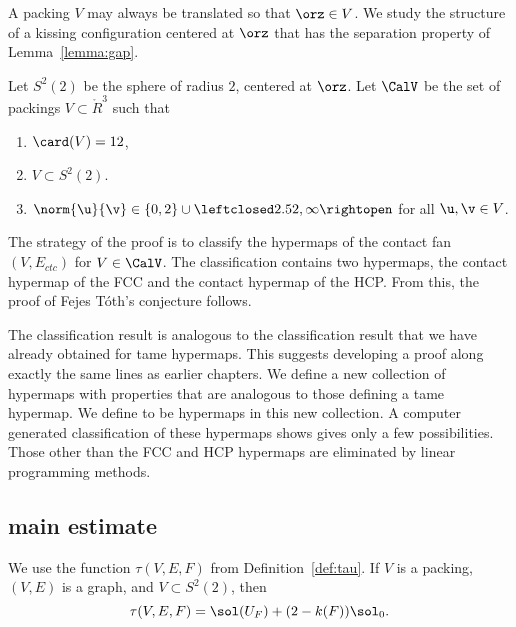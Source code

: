 A packing $V$ may always be translated so that $\orz\in V$.  We study
the structure of a kissing configuration centered at $\orz$ that
has the separation property of Lemma~\ref{lemma:gap}.

\begin{definition}[$S^2(2)$,~$\CalV$]
  Let $S^2(2)$ be the sphere of radius $2$, centered at $\orz$.  Let
  $\CalV$ be the set of packings $V\subset \ring{R}^3$ such that
\begin{enumerate}\wasitemize 
\item $\card(V) = 12$,
\item $V\subset S^2(2)$.
\item $\norm{\u}{\v} \in \{0,2\}\cup
  \leftclosed2.52,\infty\rightopen$ for all $\u,\v\in V$.
\end{enumerate}\wasitemize 
{}%
%
\end{definition}

The strategy of the proof is to classify the hypermaps of the
contact fan $(V,E_{ctc})$ for $V\in \CalV$.  The classification 
contains two hypermaps, the contact hypermap of the FCC and the contact
hypermap of the HCP.  From this, the proof
of Fejes T\'oth's conjecture  follows.

The classification result is analogous to the classification result
that we have already obtained for tame hypermaps.  This suggests
developing a proof along exactly the same lines as earlier chapters.
We define a new collection of hypermaps with properties that are
analogous to those defining a tame hypermap.  We define
 to be hypermaps in this new
collection.  A computer generated classification of these hypermaps
shows gives only a few possibilities.  Those other than the
FCC and HCP hypermaps are eliminated by linear programming methods.

\subsection{main estimate}




We use the function $\tau(V,E,F)$ from Definition~\ref{def:tau}.  If
$V$ is a packing, $(V,E)$ is a  graph, and
$V\subset S^2(2)$, then 
\[
\tau(V,E,F) = \sol(U_F) + (2-k(F)) \sol_0.
\]

